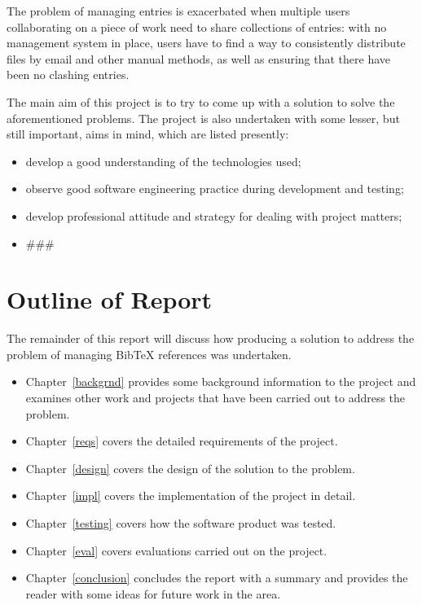\documentclass{l4proj}
\newcommand{\BibTeX}{B{\sc ib}\TeX}
\newcommand{\bibtex}{\BibTeX}
\newcommand{\revisit}{\#\#\#}
\begin{document}
The problem of managing entries is exacerbated when multiple users collaborating on a piece of work need to share collections of entries: with no management system in place, users have to find a way to consistently distribute files by email and other manual methods, as well as ensuring that there have been no clashing entries.

The main aim of this project is to try to come up with a solution to solve the aforementioned problems.  The project is also undertaken with some lesser, but still important, aims in mind, which are listed presently:
\begin{itemize}
\item develop a good understanding of the technologies used;
\item observe good software engineering practice during development and testing;
\item develop professional attitude and strategy for dealing with project matters;
\item \revisit
\end{itemize}


\section{Outline of Report}
The remainder of this report will discuss how producing a solution to address the problem of managing \bibtex{} references was undertaken. 
\begin{itemize}
\item Chapter~\ref{backgrnd} provides some background information to the project and examines other work and projects that have been carried out to address the problem.
\item Chapter~\ref{reqs} covers the detailed requirements of the project.
\item Chapter~\ref{design} covers the design of the solution to the problem.
\item Chapter~\ref{impl} covers the implementation of the project in detail.
\item Chapter~\ref{testing} covers how the software product was tested.
\item Chapter~\ref{eval} covers evaluations carried out on the project.
\item Chapter~\ref{conclusion} concludes the report with a summary and provides the reader with some ideas for future work in the area.
\end{itemize}
\end{document}
